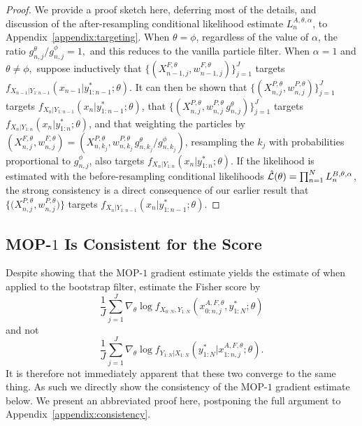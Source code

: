 \documentclass[11pt]{article}
\newcommand\arxiv[2]{#1} %
\begin{document}

\begin{proof}
    We provide a proof sketch here, deferring most of the details, and discussion of the after-resampling conditional likelihood estimate $L_n^{A,\theta,\alpha}$, to \arxiv{Appendix~\ref{appendix:targeting}}{the supplementary information}. 
    When $\theta=\phi$, regardless of the value of $\alpha$, the ratio ${g_{n,j}^\theta}/{g_{n,j}^\phi}=1,$ and this reduces to the vanilla particle filter.
    When $\alpha=1$ and $\theta\neq\phi,$ suppose inductively that $\{(X^{F,\theta}_{n-1,j},w^{F,\theta}_{n-1,j})\}_{j=1}^J$ targets $f_{X_{n-1}|Y_{1:n-1}}(x_{n-1}|y^*_{1:n-1};\theta)$.
    It can then be shown that $\{(X^{P,\theta}_{n,j},w^{P,\theta}_{n,j})\}_{j=1}^J$ targets $f_{X_{n}|Y_{1:n-1}}(x_{n}|y^*_{1:n-1};\theta)$, that $\{(X^{P,\theta}_{n,j},w^{P,\theta}_{n,j} \, g^\theta_{n,j} )\}_{j=1}^J$ targets  $f_{X_{n}|Y_{1:n}}(x_{n}|y^*_{1:n};\theta)$, and that weighting the particles by $(X^{F,\theta}_{n,j},w^{F,\theta}_{n,j}) = (X^{P,\theta}_{n,k_j}, w^{P,\theta}_{n,k_j} \, g^\theta_{n,k_j} \big/ g^\phi_{n,k_j})$,
    resampling the $k_j$ with probabilities proportional to $g^\phi_{n,j}$, also targets $f_{X_{n}|Y_{1:n}}(x_{n}|y^*_{1:n};\theta)$.
    If the likelihood is estimated with the before-resampling conditional likelihoods $\hat{\mathcal{L}}(\theta) = \prod_{n=1}^N L_n^{B,\theta,\alpha}$, the strong consistency is a direct consequence of our earlier result that $\{ \big(X^{P,\theta}_{n,j},w^{P,\theta}_{n,j}\big) \}$ targets $f_{X_{n}|Y_{1:n-1}}(x_{n}|y^*_{1:n-1};\theta)$. 
\end{proof}




\subsection{MOP-$1$ Is Consistent for the Score}

Despite showing that the MOP-$1$ gradient estimate yields the estimate of \cite{poyiadjis11, scibior21} when applied to the bootstrap filter, \cite{poyiadjis11, scibior21} estimate the Fisher score by 
$$\frac{1}{J}\sum_{j=1}^J \nabla_\theta \log f_{X_{0:N}, Y_{1:N}}\left(x_{0:n,j}^{A, F,\theta}, y_{1:N}^* ; \theta\right)$$ and not
$$\frac{1}{J}\sum_{j=1}^J \nabla_\theta \log f_{Y_{1:N}| X_{1:N}}\left(y_{1:N}^* | x_{1:n,j}^{A, F,\theta}; \theta\right).$$
It is therefore not immediately apparent that these two converge to the same thing. As such we directly show the consistency of the MOP-$1$ gradient estimate below. 
We present an abbreviated proof here, postponing the full argument to \arxiv{Appendix~\ref{appendix:consistency}}{the supplement}.
\end{document}
